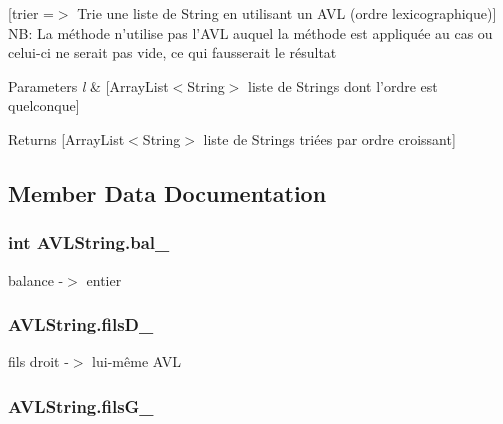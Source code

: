\mbox{[}trier =$>$ Trie une liste de String en utilisant un A\-V\-L (ordre lexicographique)\mbox{]} N\-B\-: La méthode n'utilise pas l'A\-V\-L auquel la méthode est appliquée au cas ou celui-\/ci ne serait pas vide, ce qui fausserait le résultat 
\begin{DoxyParams}{Parameters}
{\em l} & \mbox{[}Array\-List$<$\-String$>$ liste de Strings dont l'ordre est quelconque\mbox{]} \\
\hline
\end{DoxyParams}
\begin{DoxyReturn}{Returns}
\mbox{[}Array\-List$<$\-String$>$ liste de Strings triées par ordre croissant\mbox{]} 
\end{DoxyReturn}


\subsection{Member Data Documentation}
\hypertarget{class_a_v_l_string_a5a492e5ae84bdf492f68e1f41e918734}{
\subsubsection[{bal\-\_\-}]{\setlength{\rightskip}{0pt plus 5cm}int A\-V\-L\-String.\-bal\-\_\-\hspace{0.3cm}{\ttfamily [private]}}}\label{class_a_v_l_string_a5a492e5ae84bdf492f68e1f41e918734}
balance -\/$>$ entier \hypertarget{class_a_v_l_string_a683f6fd78271d50b935b0255ffc7441a}{
\subsubsection[{fils\-D\-\_\-}]{ A\-V\-L\-String.\-fils\-D\-\_\-\hspace{0.3cm}{\ttfamily [private]}}}\label{class_a_v_l_string_a683f6fd78271d50b935b0255ffc7441a}
fils droit -\/$>$ lui-\/même A\-V\-L \hypertarget{class_a_v_l_string_ad79e01875b56754629c8e0c928fcf530}{
\subsubsection[{fils\-G\-\_\-}]{ A\-V\-L\-String.\-fils\-G\-\_\-\hspace{0.3cm}{\ttfamily [private]}}}\label{class_a_v_l_string_ad79e01875b56754629c8e0c928fcf530}
